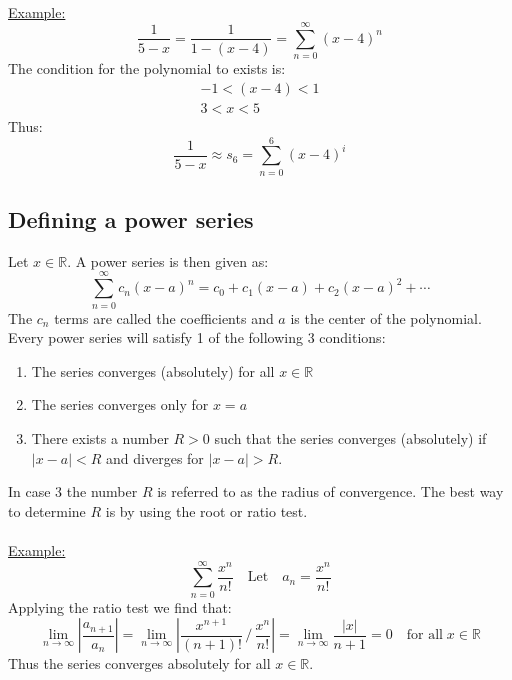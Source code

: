 \documentclass[11pt, a4paper]{article}
\newcommand*{\R}{\ensuremath{\mathbb{R}}}
\numberwithin{equation}{section}
\numberwithin{figure}{section}
\begin{document}
\\ \underline{Example:}  
\begin{equation*}
    \frac{1}{5-x} = \frac{1}{1 - (x-4)} = \sum_{n=0}^{\infty} (x-4)^n
\end{equation*}
The condition for the polynomial to exists is:
\begin{gather*}
    -1 < (x-4) < 1\\
    3 < x < 5
\end{gather*}
Thus:
\begin{equation*}
    \frac{1}{5-x} \approx s_6 = \sum_{n=0}^6 (x-4)^i
\end{equation*}


\subsection{Defining a power series}
Let $x \in \R$. A power series is then given as:
\begin{equation}
    \sum_{n=0}^\infty c_n(x-a)^n = c_0 + c_1(x-a) + c_2(x-a)^2 + \cdots
\end{equation}
The $c_n$ terms are called the coefficients and $a$ is the center of the polynomial. Every power series will satisfy 1 of the following 3 conditions:
\begin{enumerate}
    \item The series converges (absolutely) for all $x\in\R$
    \item The series converges only for $x=a$
    \item There exists a number $R > 0$ such that the series converges (absolutely) if $|x-a| < R$ and diverges for $|x-a|>R$.
\end{enumerate}
In case 3 the number $R$ is referred to as the radius of convergence. The best way to determine $R$ is by using the root or ratio test.
\\
\\ \underline{Example:}
\begin{equation*}
    \sum_{n=0}^\infty \frac{x^n}{n!} \quad \text{Let} \quad a_n = \frac{x^n}{n!}
\end{equation*}
Applying the ratio test we find that:
\begin{equation*}
    \lim_{n\to\infty} \left| \frac{a_{n+1}}{a_n} \right| = \lim_{n\to\infty} \left| \frac{x^{n+1}}{(n+1)!} \,\Big/\, \frac{x^n}{n!} \right| = \lim_{n\to\infty} \frac{|x|}{n+1} = 0 \quad \text{for all}\; x\in\R
\end{equation*}
Thus the series converges absolutely for all $x\in\R$.
\end{document}
